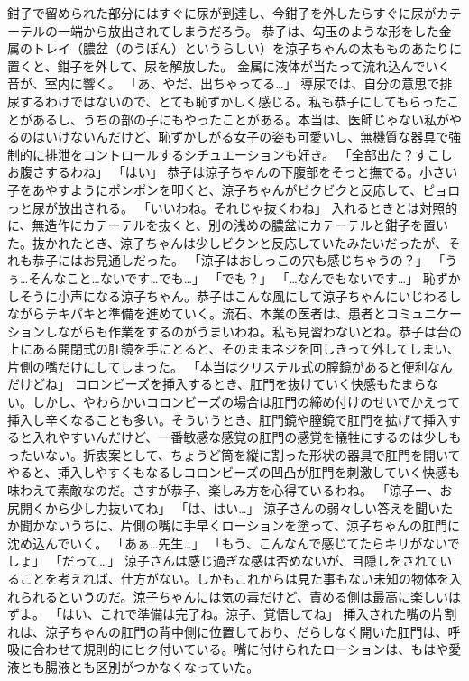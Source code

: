 鉗子で留められた部分にはすぐに尿が到達し、今鉗子を外したらすぐに尿がカテーテルの一端から放出されてしまうだろう。
恭子は、勾玉のような形をした金属のトレイ（膿盆（のうぼん）というらしい）を涼子ちゃんの太もものあたりに置くと、鉗子を外して、尿を解放した。
金属に液体が当たって流れ込んでいく音が、室内に響く。
「あ、やだ、出ちゃってる…」
導尿では、自分の意思で排尿するわけではないので、とても恥ずかしく感じる。私も恭子にしてもらったことがあるし、うちの部の子にもやったことがある。本当は、医師じゃない私がやるのはいけないんだけど、恥ずかしがる女子の姿も可愛いし、無機質な器具で強制的に排泄をコントロールするシチュエーションも好き。
「全部出た？すこしお腹さするわね」
「はい」
恭子は涼子ちゃんの下腹部をそっと撫でる。小さい子をあやすようにポンポンを叩くと、涼子ちゃんがビクビクと反応して、ピョロっと尿が放出される。
「いいわね。それじゃ抜くわね」
入れるときとは対照的に、無造作にカテーテルを抜くと、別の浅めの膿盆にカテーテルと鉗子を置いた。抜かれたとき、涼子ちゃんは少しビクンと反応していたみたいだったが、それも恭子にはお見通しだった。
「涼子はおしっこの穴も感じちゃうの？」
「うぅ…そんなこと…ないです…でも…」
「でも？」
「…なんでもないです…」
恥ずかしそうに小声になる涼子ちゃん。恭子はこんな風にして涼子ちゃんにいじわるしながらテキパキと準備を進めていく。流石、本業の医者は、患者とコミュニケーションしながらも作業をするのがうまいわね。私も見習わないとね。恭子は台の上にある開閉式の肛鏡を手にとると、そのままネジを回しきって外してしまい、片側の嘴だけにしてしまった。
「本当はクリステル式の膣鏡があると便利なんだけどね」
コロンビーズを挿入するとき、肛門を抜けていく快感もたまらない。しかし、やわらかいコロンビーズの場合は肛門の締め付けのせいでかえって挿入し辛くなることも多い。そういうとき、肛門鏡や膣鏡で肛門を拡げて挿入すると入れやすいんだけど、一番敏感な感覚の肛門の感覚を犠牲にするのは少しもったいない。折衷案として、ちょうど筒を縦に割った形状の器具で肛門を開いてやると、挿入しやすくもなるしコロンビーズの凹凸が肛門を刺激していく快感も味わえて素敵なのだ。さすが恭子、楽しみ方を心得ているわね。
「涼子ー、お尻開くから少し力抜いてね」
「は、はい…」
涼子さんの弱々しい答えを聞いたか聞かないうちに、片側の嘴に手早くローションを塗って、涼子ちゃんの肛門に沈め込んでいく。
「あぁ…先生…」
「もう、こんなんで感じてたらキリがないでしょ」
「だって…」
涼子さんは感じ過ぎな感は否めないが、目隠しをされていることを考えれば、仕方がない。しかもこれからは見た事もない未知の物体を入れられるというのだ。涼子ちゃんには気の毒だけど、責める側は最高に楽しいはずよ。
「はい、これで準備は完了ね。涼子、覚悟してね」
挿入された嘴の片割れは、涼子ちゃんの肛門の背中側に位置しており、だらしなく開いた肛門は、呼吸に合わせて規則的にヒク付いている。嘴に付けられたローションは、もはや愛液とも腸液とも区別がつかなくなっていた。
